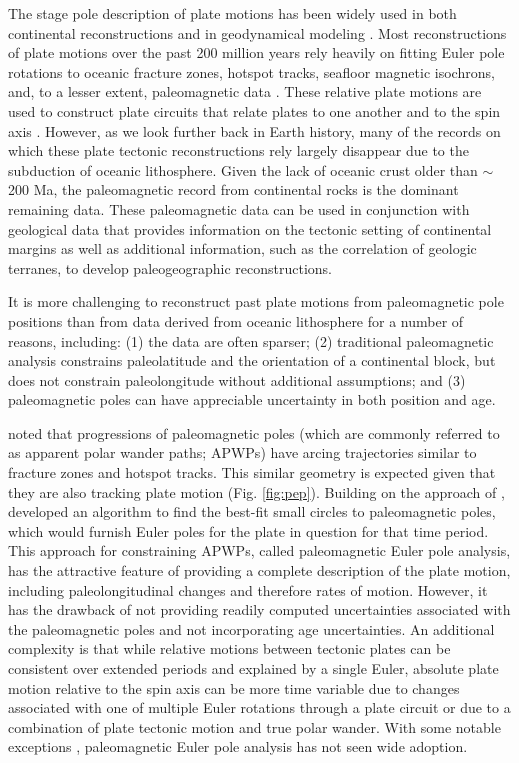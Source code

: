 \documentclass[11pt,letterpaper]{article}
\begin{document}
The stage pole description of plate motions has been widely used in both continental reconstructions \citep[e.g.][]{Boyden2011a} and in geodynamical modeling \citep[e.g.][]{Mcnamara2005a, Bull2014a}. Most reconstructions of plate motions over the past 200 million years rely heavily on fitting Euler pole rotations to oceanic fracture zones, hotspot tracks, seafloor magnetic isochrons, and, to a lesser extent, paleomagnetic data \citep{Muller1993a, Seton2012a, Muller2016a}. These relative plate motions are used to construct plate circuits that relate plates to one another and to the spin axis \citep[e.g.][]{Muller2016a, Torsvik2017a}. However, as we look further back in Earth history, many of the records on which these plate tectonic reconstructions rely largely disappear due to the subduction of oceanic lithosphere. Given the lack of oceanic crust older than $\sim$200 Ma, the paleomagnetic record from continental rocks is the dominant remaining data. These paleomagnetic data can be used in conjunction with geological data that provides information on the tectonic setting of continental margins as well as additional information, such as the correlation of geologic terranes, to develop paleogeographic reconstructions.

It is more challenging to reconstruct past plate motions from paleomagnetic pole positions than from data derived from oceanic lithosphere for a number of reasons, including: (1) the data are often sparser; (2) traditional paleomagnetic analysis constrains paleolatitude and the orientation of a continental block, but does not constrain paleolongitude without additional assumptions; and (3) paleomagnetic poles can have appreciable uncertainty in both position and age.

\cite{Gordon1984a} noted that progressions of paleomagnetic poles (which are commonly referred to as apparent polar wander paths; APWPs) have arcing trajectories similar to fracture zones and hotspot tracks. This similar geometry is expected given that they are also tracking plate motion (Fig. \ref{fig:pep}). Building on the approach of \cite{Francheteau1969a}, \cite{Gordon1984a} developed an algorithm to find the best-fit small circles to paleomagnetic poles, which would furnish Euler poles for the plate in question for that time period. This approach for constraining APWPs, called paleomagnetic Euler pole analysis, has the attractive feature of providing a complete description of the plate motion, including paleolongitudinal changes and therefore rates of motion. However, it has the drawback of not providing readily computed uncertainties associated with the paleomagnetic poles and not incorporating age uncertainties. An additional complexity is that while relative motions between tectonic plates can be consistent over extended periods and explained by a single Euler, absolute plate motion relative to the spin axis can be more time variable due to changes associated with one of multiple Euler rotations through a plate circuit or due to a combination of plate tectonic motion and true polar wander. With some notable exceptions \citep[e.g.][]{Bryan1986a, Beck1989a, Tarling1996a, Beck2003a, Smirnov2010a}, paleomagnetic Euler pole analysis has not seen wide adoption. 
\end{document}
